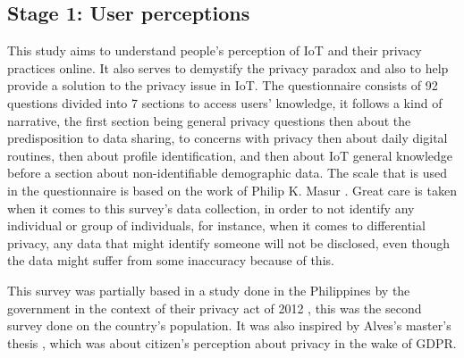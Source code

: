 
\subsection{Stage 1: User perceptions}

This study aims to understand people's perception of IoT and their privacy
practices online. It also serves to demystify the privacy paradox and also
to help provide a solution to the privacy issue in IoT. The questionnaire
consists of 92 questions divided into 7 sections to access users' knowledge,
it follows a kind of narrative, the first section being general privacy
questions then about the predisposition to data sharing, to concerns with
privacy then about daily digital routines, then about profile identification,
and then about IoT general knowledge before a section about non-identifiable
demographic data. The scale that is used in the questionnaire is based on
the work of Philip K. Masur \cite{masur2018situational}. Great care is taken
when it comes to this survey's data collection, in order to not identify
any individual or group of individuals, for instance, when it comes to differential
privacy, any data that might identify someone will not be disclosed, even
though the data might suffer from some inaccuracy because of this.

This survey was partially based in a study done in the Philippines by the
government in the context of their privacy act of 2012 \cite{Philippine2022Conduct},
this was the second survey done on the country's population. It was also
inspired by Alves's master's thesis \cite{alves2021}, which was about citizen's
perception about privacy in the wake of GDPR.

